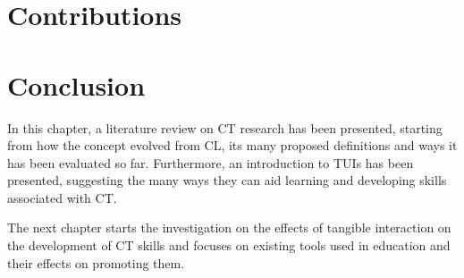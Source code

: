\section{Contributions}

\section{Conclusion}
In this chapter, a literature review on \acl{CT} research has been presented, starting from how the concept evolved from \acl{CL}, its many proposed definitions and ways it has been evaluated so far. Furthermore, an introduction to \acp{TUI} has been presented, suggesting the many ways they can aid learning and developing skills associated with \acl{CT}.

The next chapter starts the investigation on the effects of tangible interaction on the development of \ac{CT} skills and focuses on existing tools used in education and their effects on promoting them.